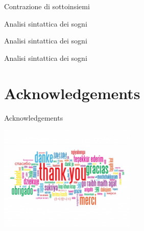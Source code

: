 \documentclass[xcolor=x11names,compress]{beamer}
\begin{document}
\begin{frame}[t]{Contrazione di sottoinsiemi}
    \vspace{-0.5cm}
    
    \begin{minipage}[t]{\textwidth}
        \centering
        
    \end{minipage}
\end{frame}

\begin{frame}[t]{Analisi sintattica dei sogni}
    \vspace{-0.2cm}
    
\end{frame}

\begin{frame}[t]{Analisi sintattica dei sogni}
    \vspace{-0.2cm}
    
\end{frame}

\begin{frame}[t]{Analisi sintattica dei sogni}
    \vspace{-0.2cm}
    
\end{frame}


\section*{Acknowledgements}
\begin{frame}{Acknowledgements}
\begin{center}
\includegraphics[width=6.5cm]{./immagini/thanks}
\end{center}
\end{frame}
\end{document}
